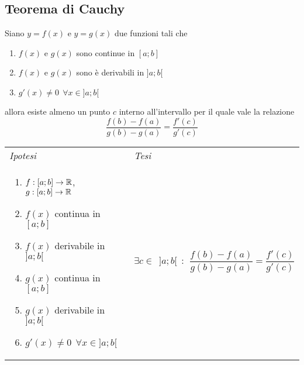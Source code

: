 \documentclass{article}     %
\begin{document}
        \subsection{Teorema di Cauchy}
        \begin{shadedTheorem}[Cauchy]
        Siano $y=f(x)$ e $y=g(x)$ due funzioni tali che 
        \begin{enumerate}
            \item $f(x)$ e $g(x)$ sono continue in $[a;b]$
            \item $f(x)$ e $g(x)$ sono è derivabili in $]a;b[$
            \item $g'(x)\neq 0 ~~ \forall x \in ]a;b[$ 
        \end{enumerate}
        allora esiste almeno un punto $c$ interno all'intervallo per il quale vale la relazione \[\frac{f(b)-f(a)}{g(b)-g(a)}=\frac{f'(c)}{g'(c)}\]
        \end{shadedTheorem}
        \begin{tabular}{m{}m{}}
            \textit{Ipotesi} & \textit{Tesi}  \\
            \begin{enumerate}
            \item $f:[a;b] \to \mathbb{R}$, $g: [a;b] \to \mathbb{R}$
            \item $f(x)$ continua in $[a;b]$
            \item $f(x)$ derivabile in $]a;b[$
            \item $g(x)$ continua in $[a;b]$
            \item $g(x)$ derivabile in $]a;b[$
            \item $g'(x)\neq 0 ~~ \forall x \in ]a;b[$
        \end{enumerate} & $\exists c \in~~]a;b[ ~~:~~ \dfrac{f(b)-f(a)}{g(b)-g(a)}=\dfrac{f'(c)}{g'(c)}$
        \end{tabular}
\end{document}
